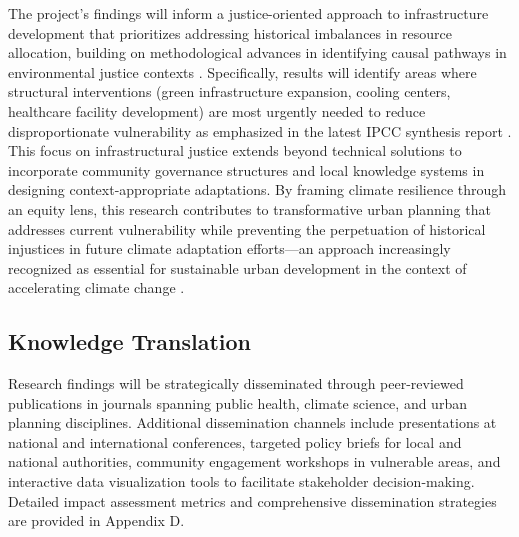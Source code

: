 The project's findings will inform a justice-oriented approach to infrastructure development that prioritizes addressing historical imbalances in resource allocation, building on methodological advances in identifying causal pathways in environmental justice contexts \citep{Velasquez2023}. Specifically, results will identify areas where structural interventions (green infrastructure expansion, cooling centers, healthcare facility development) are most urgently needed to reduce disproportionate vulnerability as emphasized in the latest IPCC synthesis report \citep{IPCC2024}. This focus on infrastructural justice extends beyond technical solutions to incorporate community governance structures and local knowledge systems in designing context-appropriate adaptations. By framing climate resilience through an equity lens, this research contributes to transformative urban planning that addresses current vulnerability while preventing the perpetuation of historical injustices in future climate adaptation efforts—an approach increasingly recognized as essential for sustainable urban development in the context of accelerating climate change \citep{Praharaj2024}.

\subsection{Knowledge Translation}
Research findings will be strategically disseminated through peer-reviewed publications in journals spanning public health, climate science, and urban planning disciplines. Additional dissemination channels include presentations at national and international conferences, targeted policy briefs for local and national authorities, community engagement workshops in vulnerable areas, and interactive data visualization tools to facilitate stakeholder decision-making. Detailed impact assessment metrics and comprehensive dissemination strategies are provided in Appendix D.